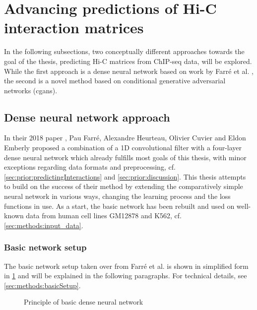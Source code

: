 %
\section{Advancing predictions of Hi-C interaction matrices}
In the following subsections, two conceptually different approaches towards the goal of the thesis,
predicting Hi-C matrices from ChIP-seq data, will be explored.
While the first approach is a dense neural network based on work by Farr\'e et al. \cite{Farre2018a},
the second is a novel method based on conditional generative adversarial networks (\acrshort{cgan}s).

\subsection{Dense neural network approach}\label{sec:improve:DNNapproach}
In their 2018 paper \cite{Farre2018a}, Pau Farr\'e, Alexandre Heurteau, Olivier Cuvier and Eldon Emberly
proposed a combination of a 1D convolutional filter with a four-layer dense neural network 
which already fulfills most goals of this thesis, with minor exceptions regarding data formats and preprocessing, 
cf. \cref{sec:prior:predictingInteractions} and \ref{sec:prior:discussion}.
This thesis attempts to build on the success of their method by extending the comparatively simple neural network
in various ways, changing the learning process and the loss functions in use.
As a start, the basic network has been rebuilt and used on well-known data from human cell lines GM12878 and K562, cf. \cref{sec:methods:input_data}.

\subsubsection{Basic network setup} \label{sec:improve:basicNetwork}
The basic network setup taken over from Farr\'e et al. \cite{Farre2018a} is shown in simplified form in \cref{fig:improve:priciple_basic_dnn}
and will be explained in the following paragraphs. For technical details, see \cref{sec:methods:basicSetup}.
\begin{figure}[hbp]
    \small
    \centering
    \caption{Principle of basic dense neural network}
    \label{fig:improve:priciple_basic_dnn}
\end{figure}

